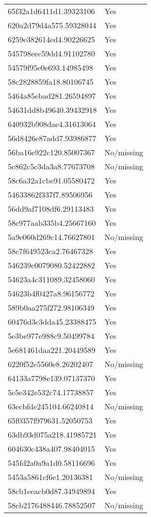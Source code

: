 \begin{tabular}{ll}
65f32a1d6411d1.39323106 & Yes \\
620a2d79d4a575.59328044 & Yes \\
6259e382614ed4.90226625 & Yes \\
545798eec59dd4.91102780 & Yes \\
54579f95e0e693.14985498 & Yes \\
58c2828859fa18.80106745 & Yes \\
5464a85ebad281.26594897 & Yes \\
54631dd8b49640.39432918 & Yes \\
640932b908dae4.31613064 & Yes \\
56d8426e87add7.93986877 & Yes \\
56ba16e922c120.85007367 & No/missing \\
5c862c5c3da3a8.77673708 & No/missing \\
58c6a32a1cbe91.05580472 & Yes \\
54633862f337f7.89506956 & Yes \\
56dd9af7108df6.29113483 & Yes \\
58c977aab335b4.25667160 & Yes \\
5a9e060d269c14.76627801 & No/missing \\
58c7f649523ca2.76467328 & Yes \\
546239c0079080.52422882 & Yes \\
54623a4c311089.32458060 & Yes \\
54623b4f0427a8.96156772 & Yes \\
589b0aa275f272.98106349 & Yes \\
60476d3c3dda45.23388475 & Yes \\
5e3be977e988c9.50499784 & Yes \\
5e681461daa221.20449589 & Yes \\
6220f52e5560e8.26202407 & No/missing \\
64133a7798e139.07137370 & Yes \\
5e5e342e532c74.17738857 & Yes \\
63ecbfde245104.66240814 & No/missing \\
65f0357f979631.52050753 & Yes \\
63db93d075a218.41985721 & Yes \\
604630c438a407.98404015 & Yes \\
545fd2a0a9a1d0.58116696 & Yes \\
5453a5861cf6e1.20136381 & No/missing \\
58cb1eeacb0d87.34949894 & Yes \\
58cb2176488446.78852507 & No/missing \\

\end{tabular}
